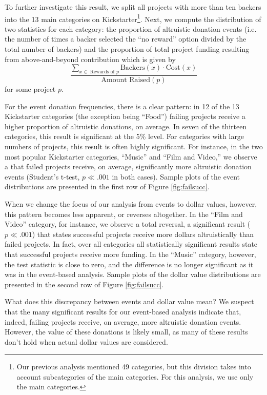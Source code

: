 \documentclass[letterpaper]{article}
\begin{document}
To further investigate this result, we split all projects with more than ten backers into the 13 main categories on Kickstarter\footnote{Our previous analysis mentioned 49 categories, but this division takes into account subcategories of the main categories. For this analysis, we use only the main categories.}. Next, we compute the distribution of two statistics for each category: the proportion of altruistic donation events (i.e. the number of times a backer selected the ``no reward'' option divided by the total number of backers) and the proportion of total project funding resulting from above-and-beyond contribution which is given by
\begin{equation} \label{eq:altruism}
\frac{\sum\limits_{x \in \text{ Rewards of $p$}} \text{Backers}(x) \cdot \text{Cost}(x)}
{\text{Amount Raised}(p)}
\end{equation}
for some project $p$.

For the event donation frequencies, there is a clear pattern: in 12 of the 13 Kickstarter categories (the exception being ``Food'') failing projects receive a higher proportion of altruistic donations, on average. In seven of the thirteen categories, this result is significant at the 5\% level. For categories with large numbers of projects, this result is often highly significant. For instance, in the two most popular Kickstarter categories, ``Music'' and ``Film and Video,'' we observe a that failed projects receive, on average, significantly more altruistic donation events (Student's t-test, $p\ll.001$ in both cases). Sample plots of the event distributions are presented in the first row of Figure \ref{fig:failsucc}.

When we change the focus of our analysis from events to dollar values, however, this pattern becomes less apparent, or reverses altogether. In the ``Film and Video'' category, for instance, we observe a total reversal, a significant result ($p \ll .001$) that states successful projects receive more dollars altruistically than failed projects. In fact, over all categories all statistically significant results state that successful projects receive more funding. In the ``Music'' category, however, the test statistic is close to zero, and the difference is no longer significant as it was in the event-based analysis. Sample plots of the dollar value distributions are presented in the second row of Figure \ref{fig:failsucc}.

What does this discrepancy between events and dollar value mean? We suspect that the many significant results for our event-based analysis indicate that, indeed, failing projects receive, on average, more altruistic donation events. However, the value of these donations is likely small, as many of these results don't hold when actual dollar values are considered.
\end{document}
